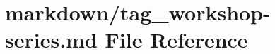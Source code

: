 \hypertarget{tag__workshop-series_8md}{}\section{markdown/tag\+\_\+workshop-\/series.md File Reference}
\label{tag__workshop-series_8md}
